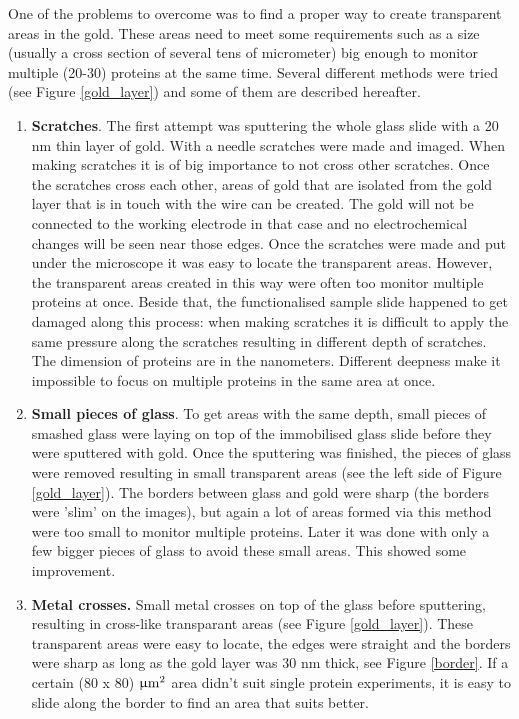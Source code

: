 \documentclass[twoside,single]{lion-msc}
\begin{document}
One of the problems to overcome was to find a proper way to create transparent areas in the gold. These areas need to meet some requirements such as a size (usually a cross section of several tens of micrometer) big enough to monitor multiple (20-30) proteins at the same time.
Several different methods were tried (see Figure \ref{gold_layer}) and some of them are described hereafter.
\begin{enumerate}
\item \textbf{Scratches}.  The first attempt was sputtering the whole glass slide with a 20 nm thin layer of gold. With a needle scratches were made and imaged. When making scratches it is of big importance to not cross other scratches. Once the scratches cross each other, areas of gold that are isolated from the gold layer that is in touch with the wire can be created. The gold will not be connected to the working electrode in that case and no electrochemical changes will be seen near those edges. Once the scratches were made and put under the microscope it was easy to locate the transparent areas. However, the transparent areas created in this way were often too monitor multiple proteins at once. Beside that, the functionalised sample slide happened to get damaged along this process: when making scratches it is difficult to apply the same pressure along the scratches resulting in different depth of scratches. The dimension of proteins are in the nanometers. Different deepness make it impossible to focus on multiple proteins in the same area at once.
\item \textbf{Small pieces of glass}. To get areas with the same depth, small pieces of smashed glass were laying on top of the immobilised glass slide before they were sputtered with gold. Once the sputtering was finished, the pieces of glass were removed resulting in small transparent areas (see the left side of Figure \ref{gold_layer}). The borders between glass and gold were sharp (the borders were 'slim' on the images), but again a lot of areas formed via this method were too small to monitor multiple proteins. Later it was done with only a few bigger pieces of glass to avoid these small areas. This showed some improvement. 
\item \textbf{Metal crosses.} Small metal crosses on top of the glass before sputtering, resulting in cross-like transparant areas (see Figure \ref{gold_layer}). These transparent areas were easy to locate, the edges were straight and the borders were sharp as long as the gold layer was 30 nm thick, see Figure \ref{border}. If a certain (80 x 80) $\upmu \textup{m}^{2}$ area didn't suit single protein experiments, it is easy to slide along the border to find an area that suits better. 
\end{enumerate}
\end{document}
